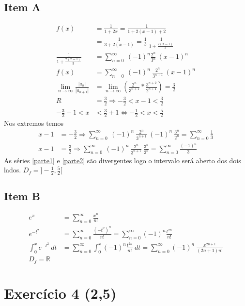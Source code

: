 \documentclass[12pt,openany, letterpaper]{book}
\newcommand{\LI}[1][n]{\lim_{{#1} \rightarrow \infty}}
\newcommand{\soma}[2][n]{\sum_{{#1} = #2}^\infty}
\newcommand{\E}[1]{Exercício #1}
\begin{document}
{{\begin{multicols}{2}
    \subsection*{Item A} 
    \begin{align*}
        f(x) &= \frac{1}{1+2x} = \frac{1}{1+2(x-1) + 2} \\
        &= \frac{1}{3 + 2(x-1)} = \frac{1}{3} \ \frac{1}{1+\frac{2(x-1)}{3}} \\
        \frac{1}{1+\frac{2(x-1)}{3}} &= \soma{0}\ (-1)^n \frac{2^n}{3^n} \ (x-1)^n \\
        f(x) &= \soma{0} \ (-1)^n \ \frac{2^n}{3^{n+1}} \ (x-1)^n \\
         \LI\frac{|a_n|}{|a_{n+1}|} &= \LI \left( \frac{2^n}{3^{n+1}}*\frac{3^{n+2}}{2^{n+1}} \right) = \frac{3}{2} \\
         R &= \frac{3}{2} \Rightarrow -\frac{3}{2} < x-1 < \frac{3}{2} \\
         -\frac{3}{2}+1 < x &< \frac{3}{2}+1 \Longleftrightarrow -\frac{1}{2} < x < \frac{5}{2}
    \end{align*}
    Nos extremos temos \begin{align}
        x - 1 &= -\frac{3}{2} \Rightarrow \soma{0} \ (-1)^n \ \frac{2^n}{3^{n+1}} \ (-1)^n \ \frac{3^n}{2^n} = \soma{0} \frac{1}{3} \label{parte1} \\
        x-1 &= \frac{3}{2} \Rightarrow \soma{0} \ (-1)^n \ \frac{2^n}{3^{n+1}} \ \frac{3^n}{2^n} = \soma{0} \frac{(-1)^n}{3} \label{parte2}
    \end{align}
    As séries \ref{parte1} e \ref{parte2} são divergentes logo o intervalo será aberto dos dois lados. $D_f = ]-\frac{1}{2},\frac{5}{2}[$
    \subsection*{Item B}
    \begin{align*}
        e^x &= \soma{0} \frac{x^n}{n!} \\
        e^{-t^2} &= \soma{0} \frac{(-t^2)^n}{n!} = \soma{0} (-1)^n \frac{t^{2n}}{n!}\\
        \int_0^x e^{-t^2} \ dt &= \soma{0} \int_0^x (-1)^n \frac{t^{2n}}{n!} \ dt = \soma{0} (-1)^n \ \frac{x^{2n+1}}{(2n+1)n!} \\
        D_f = \mathds{R}
    \end{align*}
\end{multicols}

\newpage

\section*{\E{4} (2,5)}

}}
\end{document}
